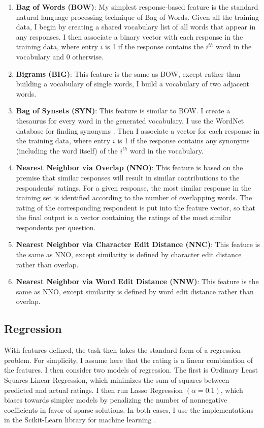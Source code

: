\begin{enumerate}

\item \textbf{Bag of Words (BOW)}: My simplest response-based feature is the standard natural language processing technique of Bag of Words. Given all the training data, I begin by creating a shared vocabulary list of all words that appear in any responses. I then associate a binary vector with each response in the training data, where entry $i$ is 1 if the response contains the $i^{th}$ word in the vocabulary and 0 otherwise.

\item \textbf{Bigrams (BIG)}: This feature is the same as BOW, except rather than building a vocabulary of single words, I build a vocabulary of two adjacent words.

\item \textbf{Bag of Synsets (SYN)}: This feature is similar to BOW. I create a thesaurus for every word in the generated vocabulary. I use the WordNet database for finding synonyms \cite{fellbaum1998wordnet}. Then I associate a vector for each response in the training data, where entry $i$ is 1 if the response contains any synonyms (including the word itself) of the $i^{th}$ word in the vocabulary.

\item \textbf{Nearest Neighbor via Overlap (NNO)}: This feature is based on the premise that similar responses will result in similar contributions to the respondents' ratings. For a given response, the most similar response in the training set is identified according to the number of overlapping words. The rating of the corresponding respondent is put into the feature vector, so that the final output is a vector containing the ratings of the most similar respondents per question.

\item \textbf{Nearest Neighbor via Character Edit Distance (NNC)}: This feature is the same as NNO, except similarity is defined by character edit distance rather than overlap.

\item \textbf{Nearest Neighbor via Word Edit Distance (NNW)}: This feature is the same as NNO, except similarity is defined by word edit distance rather than overlap.


\end{enumerate}

\subsection{Regression}
With features defined, the task then takes the standard form of a regression problem. For simplicity, I assume here that the rating is a linear combination of the features. I then consider two models of regression. The first is Ordinary Least Squares Linear Regression, which minimizes the sum of squares between predicted and actual ratings. I then run Lasso Regression $(\alpha = 0.1)$, which biases towards simpler models by penalizing the number of nonnegative coefficients in favor of sparse solutions. In both cases, I use the implementations in the Scikit-Learn library for machine learning \cite{pedregosa2011scikit}.
